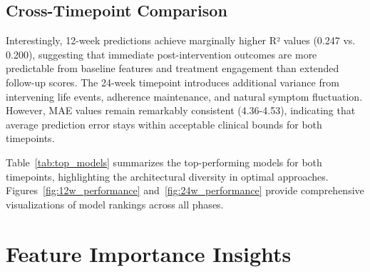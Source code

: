 \documentclass[conference]{IEEEtran}
\begin{document}
\subsection{Cross-Timepoint Comparison}
Interestingly, 12-week predictions achieve marginally higher R² values (0.247 vs. 0.200), suggesting that immediate post-intervention outcomes are more predictable from baseline features and treatment engagement than extended follow-up scores. The 24-week timepoint introduces additional variance from intervening life events, adherence maintenance, and natural symptom fluctuation. However, MAE values remain remarkably consistent (4.36-4.53), indicating that average prediction error stays within acceptable clinical bounds for both timepoints.

\begin{table}[t]
\centering
\caption{Top 5 Models for Each Prediction Timepoint}
\label{tab:top_models}
\end{table}

Table~\ref{tab:top_models} summarizes the top-performing models for both timepoints, highlighting the architectural diversity in optimal approaches. Figures~\ref{fig:12w_performance} and~\ref{fig:24w_performance} provide comprehensive visualizations of model rankings across all phases.

\section{Feature Importance Insights}
\end{document}
